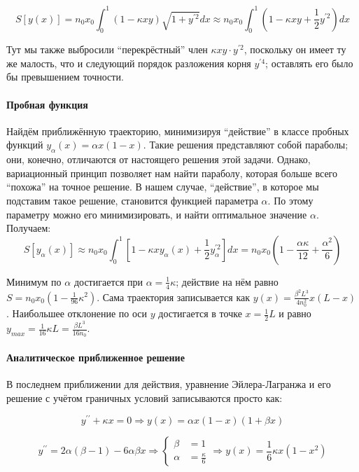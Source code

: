 \documentclass[a4paper,12pt]{article}
\begin{document}
\[
S[y(x)]=n_{0}x_{0}\int_{0}^{1}(1-\kappa xy)\sqrt{1+y^{\prime2}}dx
\approx n_{0}x_{0}\int_{0}^{1}(1-\kappa xy+\frac{1}{2}y^{\prime2})dx
\]

\noindent
Тут мы также выбросили ``перекрёстный'' член $\kappa xy\cdot y^{\prime2}$,
поскольку он имеет ту же малость, что и следующий порядок разложения
корня $y^{\prime4}$; оставлять его было бы превышением точности.


\paragraph{Пробная функция}

Найдём приближённую траекторию, минимизируя ``действие'' в классе
пробных функций $y_{\alpha}(x)=\alpha x(1-x)$. Такие решения представляют
собой параболы; они, конечно, отличаются от настоящего решения этой
задачи. Однако, вариационный принцип позволяет нам найти параболу,
которая больше всего ``похожа'' на точное решение. В нашем случае,
``действие'', в которое мы подставим такое решение, становится функцией
параметра $\alpha$. По этому параметру можно его минимизировать,
и найти оптимальное значение $\alpha$. Получаем:
\[
S[y_{\alpha}(x)]\approx n_{0}x_{0}\int_{0}^{1}\left[1-\kappa xy_{\alpha}(x)+\frac{1}{2}y_{\alpha}^{\prime2}\right]dx
=n_{0}x_{0}\left(1-\frac{\alpha\kappa}{12}+\frac{\alpha^{2}}{6}\right)
\]

\noindent
Минимум по $\alpha$ достигается при $\alpha=\frac{1}{4}\kappa$;
действие на нём равно $S=n_{0}x_{0}(1-\frac{1}{96}\kappa^{2})$. Сама
траектория записывается как $y(x)=\frac{\beta^{2}L^{3}}{4n_{0}^{2}}x(L-x)$.
Наибольшее отклонение по оси $y$ достигается в точке $x=\frac{1}{2}L$
и равно $y_{max}=\frac{1}{16}\kappa L=\frac{\beta L^{3}}{16n_{0}}$.


\paragraph{Аналитическое приближенное решение}

В последнем приближении для действия, уравнение Эйлера-Лагранжа и
его решение с учётом граничных условий записываются просто как:

\[
y^{\prime\prime}+\kappa x=0\Rightarrow y(x)=\alpha x(1-x)(1+\beta x)
\]


\[
y^{\prime\prime}=2\alpha(\beta-1)-6\alpha\beta x\Rightarrow\begin{cases}
\beta & =1\\
\alpha & =\frac{\kappa}{6}
\end{cases}
\Rightarrow y(x)=\frac{1}{6}\kappa x (1-x^2)
\]
\end{document}
